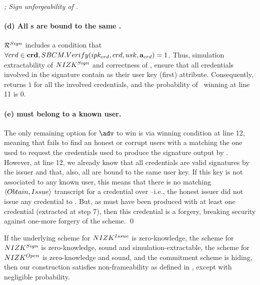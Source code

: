 \begin{proof}[; Sign unforgeability of \CUASGen]
  \paragraph{(d) All {\cred}s are bound to the same \usk.} %
  $\mathcal{R}^{Sign}$ includes a condition that $\forall crd \in \mathbf{crd},
  SBCM.Verify(ipk_{crd},crd,usk,\mathbf{a}_{crd}) = 1$. Thus, simulation
  extractability of $NIZK^{Sign}$ and correctness of \SBCM, ensure that all
  credentials involved in the signature contain \usk as their user key (first)
  attribute. Consequently, \IdentifyCred returns $1$ for all the involved
  credentials, and the probability of \adv~winning at line 11 is $0$.

  \paragraph{(e) \usk must belong to a known user.} %
  The only remaining option for $\adv$ to win is via winning condition at line
  12, meaning that \IdentifyUK fails to find an honest or corrupt users with
  a \usk matching the one used to request the credentials used to produce the
  signature output by \adv. However, at line 12, we already know that all
  credentials are valid signatures by the issuer and that, also, all are bound
  to the same user key. If this key is not associated to any known user, this
  means that there is no matching $\langle Obtain,Issue\rangle$ transcript for
  a credential over \usk --i.e., the honest issuer did not issue any credential
  to \usk. But, as \sig must have been produced with at least one credential
  (extracted at step 7), then this credential is a forgery, breaking security
  against one-more forgery of the \SBCM scheme.
  \qed
\end{proof}

\begin{theorem}
  \label{thm:frame-uas}
  If the underlying scheme for $NIZK^{Issue}$ is zero-knowledge, the scheme
  for $NIZK^{Sign}$ is zero-knowledge, sound and simulation-extractable, the
  scheme for $NIZK^{Open}$ is zero-knowledge and sound, and the commitment
  scheme is hiding, then our \CUASGen construction satisfies non-frameability as
  defined in , except with negligible probability.
\end{theorem}

